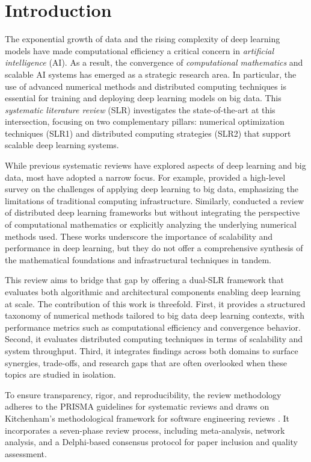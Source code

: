 \documentclass[acmsmall]{acmart}
\begin{document}
\section{Introduction}\label{sec:introduction}
The exponential growth of data and the rising complexity of deep learning models have made computational efficiency a critical concern in \emph{artificial intelligence} (AI). As a result, the convergence of \emph{computational mathematics} and scalable AI systems has emerged as a strategic research area. In particular, the use of advanced numerical methods and distributed computing techniques is essential for training and deploying deep learning models on big data. This \emph{systematic literature review} (SLR) investigates the state-of-the-art at this intersection, focusing on two complementary pillars: numerical optimization techniques (SLR1) and distributed computing strategies (SLR2) that support scalable deep learning systems.

While previous systematic reviews have explored aspects of deep learning and big data, most have adopted a narrow focus. For example, \citet{najafabadi2015deep} provided a high-level survey on the challenges of applying deep learning to big data, emphasizing the limitations of traditional computing infrastructure. Similarly, \citet{zhang2021distributed} conducted a review of distributed deep learning frameworks but without integrating the perspective of computational mathematics or explicitly analyzing the underlying numerical methods used. These works underscore the importance of scalability and performance in deep learning, but they do not offer a comprehensive synthesis of the mathematical foundations and infrastructural techniques in tandem.

This review aims to bridge that gap by offering a dual-SLR framework that evaluates both algorithmic and architectural components enabling deep learning at scale. The contribution of this work is threefold. First, it provides a structured taxonomy of numerical methods tailored to big data deep learning contexts, with performance metrics such as computational efficiency and convergence behavior. Second, it evaluates distributed computing techniques in terms of scalability and system throughput. Third, it integrates findings across both domains to surface synergies, trade-offs, and research gaps that are often overlooked when these topics are studied in isolation.

To ensure transparency, rigor, and reproducibility, the review methodology adheres to the PRISMA guidelines for systematic reviews \citep{moher2009preferred} and draws on Kitchenham's methodological framework for software engineering reviews \citep{kitchenham2007guidelines}. It incorporates a seven-phase review process, including meta-analysis, network analysis, and a Delphi-based consensus protocol for paper inclusion and quality assessment.
\end{document}
